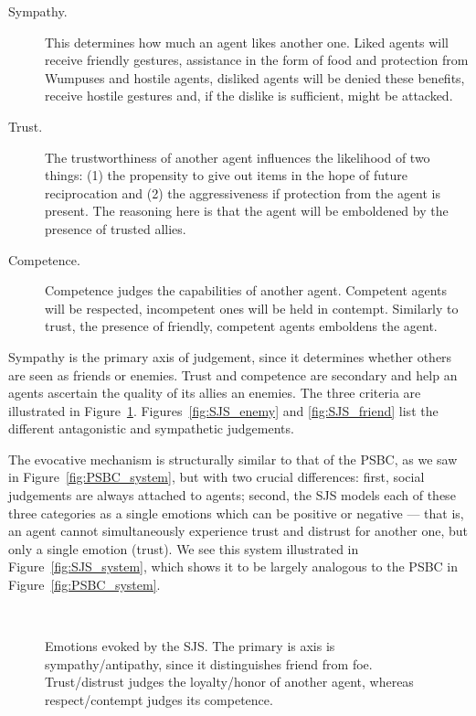 \begin{description}
	\item[Sympathy.] This determines how much an agent likes another one. Liked agents will receive friendly gestures, assistance in the form of food and protection from Wumpuses and hostile agents, disliked agents will be denied these benefits, receive hostile gestures and, if the dislike is sufficient, might be attacked.
	\item[Trust.] The trustworthiness of another agent influences the likelihood of two things: (1) the propensity to give out items in the hope of future reciprocation and (2) the aggressiveness if protection from the agent is present. The reasoning here is that the agent will be emboldened by the presence of trusted allies.
	\item[Competence.] Competence judges the capabilities of another agent. Competent agents will be respected, incompetent ones will be held in contempt. Similarly to trust, the presence of friendly, competent agents emboldens the agent.
\end{description}

Sympathy is the primary axis of judgement, since it determines whether others are seen as friends or enemies. Trust and competence are secondary and help an agents ascertain the quality of its allies an enemies. The three criteria are illustrated in Figure~\ref{fig:SJS}. Figures~\ref{fig:SJS_enemy} and \ref{fig:SJS_friend} list the different antagonistic and sympathetic judgements.

The evocative mechanism is structurally similar to that of the PSBC, as we saw in Figure~\ref{fig:PSBC_system}, but with two crucial differences: first, social judgements are always attached to agents; second, the SJS models each of these three categories as a single emotions which can be positive or negative --- that is, an agent cannot simultaneously experience trust and distrust for another one, but only a single emotion (trust). We see this system illustrated in Figure~\ref{fig:SJS_system}, which shows it to be largely analogous to the PSBC in Figure~\ref{fig:PSBC_system}.

\begin{figure}
	\centering
	\\
	\caption{Emotions evoked by the SJS. The primary is axis is sympathy/antipathy, since it distinguishes friend from foe. Trust/distrust judges the loyalty/honor of another agent, whereas respect/contempt judges its competence.}
	\label{fig:SJS}
\end{figure}

